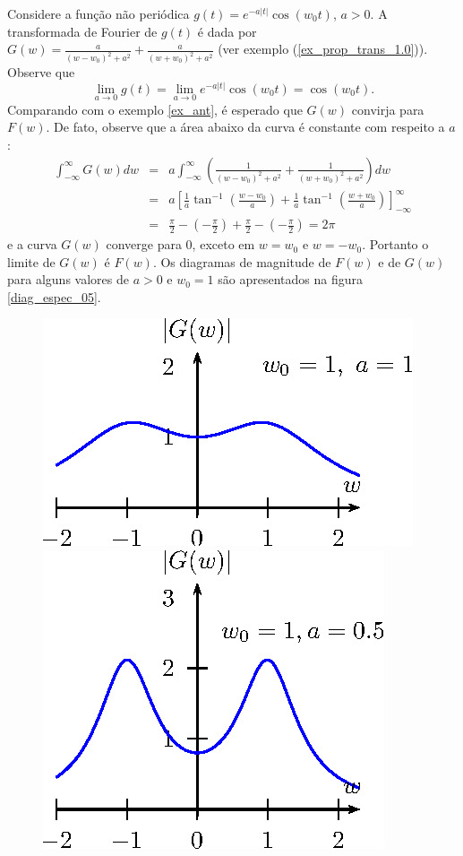 \begin{ex} Considere a função não periódica $g(t)=e^{-a|t|}\cos(w_0 t)$, $a>0$. A transformada de Fourier de $g(t)$ é dada por $G(w)=\frac{a}{(w-w_0)^2+a^2}+\frac{a}{(w+w_0)^2+a^2}$ (ver exemplo (\ref{ex_prop_trans_1.0})). Observe que 
\begin{equation}
\lim_{a\to 0}g(t)=\lim_{a\to 0} e^{-a|t|}\cos(w_0 t)=\cos(w_0 t).
\end{equation}
Comparando com o exemplo \ref{ex_ant}, é esperado que $G(w)$ convirja para $F(w)$. De fato, observe que a área abaixo da curva é constante com respeito a $a$:
\begin{eqnarray*}
\int_{-\infty}^\infty G(w)dw&=&a\int_{-\infty}^\infty \left(\frac{1}{(w-w_0)^2+a^2}+\frac{1}{(w+w_0)^2+a^2}\right)dw\\
&=&a\left[\frac{1}{a}\tan^{-1}\left(\frac{w-w_0}{a}\right)+\frac{1}{a}\tan^{-1}\left(\frac{w+w_0}{a}\right)\right]_{-\infty}^\infty\\
&=&\frac{\pi}{2}-\left(-\frac{\pi}{2}\right)+\frac{\pi}{2}-\left(-\frac{\pi}{2}\right)=2\pi
\end{eqnarray*}
e a curva $G(w)$ converge para 0, exceto em $w=w_0$ e $w=-w_0$. Portanto o limite de $G(w)$ é $F(w)$. Os diagramas de magnitude de $F(w)$ e de $G(w)$ para alguns valores de $a>0$ e $w_0=1$ são apresentados na figura \ref{diag_espec_05}.
\begin{figure}[!ht]
\begin{center}
\includegraphics[width=.48\textwidth]{cap_propriedades_transformada/pics/figura_4}
\includegraphics[width=.48\textwidth]{cap_propriedades_transformada/pics/figura_5}\vspace{30pt}

\end{center}
\end{figure}
\end{ex}
